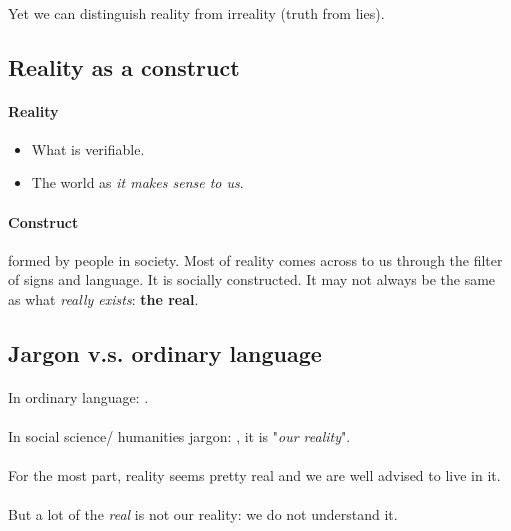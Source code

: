 \documentclass{article}
\begin{document}
	\paragraph{} Yet we can distinguish reality from irreality (truth from lies).
	
	\subsection{Reality as a construct}
	\paragraph{Reality}
	\begin{itemize}
	    \item What is verifiable.
	    \item The world as \emph{it makes sense to us}.
	\end{itemize}
	\paragraph{Construct} formed by people in society. Most of reality comes across to us through the filter of signs and language.
	\newline It is socially constructed. It may not always be the same as what \emph{really exists}: \textbf{the real}.
	
	\subsection{Jargon v.s. ordinary language}
	\paragraph{} In ordinary language: .
	\paragraph{} In social science/ humanities jargon: , it is "\emph{our reality}".
	\paragraph{} For the most part, reality seems pretty real and we are well advised to live in it.
	\paragraph{} But a lot of the \emph{real} is not our reality: we do not understand it.
	
\end{document}
